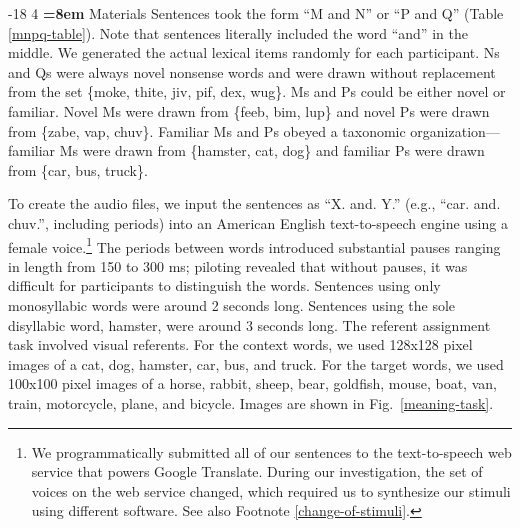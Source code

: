 \documentclass[man,longtable, floatmark]{my-apa6}
\makeatletter
\renewcommand\subsubsection{\@startsection{subsubsection}{3}{\z@}%
                       {-18\p@ \@plus -4\p@ \@minus -4\p@}%
                       {4\p@ \@plus 2\p@ \@minus 2\p@}%
                       {\normalfont\normalsize\bfseries\boldmath
                        \rightskip=\z@ \@plus 8em\pretolerance=10000 }}
\makeatother
\begin{document}
\subsubsection{Materials}
Sentences took the form ``M and N'' or ``P and Q'' (Table \ref{mnpq-table}). Note that sentences literally included the word ``and'' in the middle. We generated the actual lexical items randomly for each participant. Ns and Qs were always novel nonsense words and were drawn without replacement from the set \{moke, thite, jiv, pif, dex, wug\}. Ms and Ps could be either novel or familiar. Novel Ms were drawn from \{feeb, bim, lup\} and novel Ps were drawn from \{zabe, vap, chuv\}. Familiar Ms and Ps obeyed a taxonomic organization---familiar Ms were drawn from \{hamster, cat, dog\} and familiar Ps were drawn from \{car, bus, truck\}.

To create the audio files, we input the sentences as ``X. and. Y.'' (e.g., ``car. and. chuv.'', including periods) into an American English text-to-speech engine using a female voice.\footnote{\label{tts} We programmatically submitted all of our sentences to the text-to-speech web service that powers Google Translate. During our investigation, the set of voices on the web service changed, which required us to synthesize our stimuli using different software. See also Footnote \ref{change-of-stimuli}.} The periods between words introduced substantial pauses ranging in length from 150 to 300 ms; piloting revealed that without pauses, it was difficult for participants to distinguish the words. Sentences using only monosyllabic words were around 2 seconds long. Sentences using the sole disyllabic word, hamster, were around 3 seconds long.  The referent assignment task involved visual referents. For the context words, we used 128x128 pixel images of a cat, dog, hamster, car, bus, and truck. For the target words, we used 100x100 pixel images of a horse, rabbit, sheep, bear, goldfish, mouse, boat, van, train, motorcycle, plane, and bicycle. Images are shown in Fig.~\ref{meaning-task}.
\end{document}
